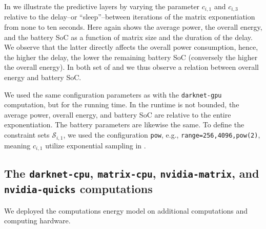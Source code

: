 In  we illustrate the predictive layers by varying the parameter $c_{i,1}$ and $c_{i,3}$ relative to the delay--or ``sleep''--between iterations of the matrix exponentiation from none to ten seconds. Here again  shows the average power,  the overall energy, and  the battery SoC as a function of matrix size and the duration of the delay. We observe that the latter directly affects the overall power consumption, hence, the higher the delay, the lower the remaining battery SoC (conversely the higher the overall energy). In both set of  and  we thus observe a relation between overall energy and battery SoC.

We used the same configuration parameters as with the {\small\tt darknet-gpu} computation, but for the running time. In  the runtime is not bounded, the average power, overall energy, and battery SoC are relative to the entire exponentiation. The battery parameters are likewise the same. To define the constraint sets $\mathcal{S}_{i,1}$, we used the configuration {\small\tt pow}, e.g., {\small\tt range=256,4096,pow(2)}, meaning $c_{i,1}$ utilize exponential sampling in . 

\subsection*{The \texttt{darknet-cpu}, \texttt{matrix-cpu}, \texttt{nvidia-matrix}, and \texttt{nvidia-quicks} computations}

We deployed the computations energy model on additional computations and computing hardware. 

